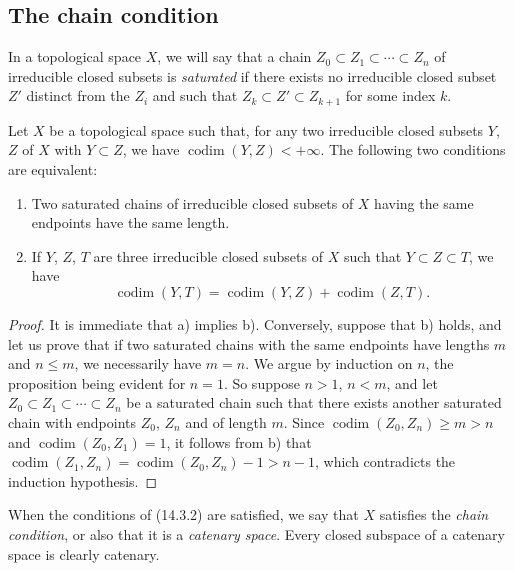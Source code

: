\subsection{The chain condition}
\label{subsection:0.14.3}

\begin{env}[14.3.1]
\label{0.14.3.1}
In a topological space $X$, we will say that a chain
$Z_0\subset Z_1\subset\cdots\subset Z_n$ of irreducible closed subsets is
\emph{saturated} if there exists no irreducible closed subset $Z'$ distinct
from the $Z_i$ and such that $Z_k\subset Z'\subset Z_{k+1}$ for some index $k$.
\end{env}

\begin{proposition}[14.3.2]
\label{0.14.3.2}
Let $X$ be a topological space such that, for any two irreducible closed
subsets $Y$, $Z$ of $X$ with $Y\subset Z$, we have
$\operatorname{codim}(Y,Z)<+\infty$. The following two conditions are
equivalent:
\begin{enumerate}
  \item[\rm(a)] Two saturated chains of irreducible closed subsets of $X$
  having the same endpoints have the same length.
  \item[\rm(b)] If $Y$, $Z$, $T$ are three irreducible closed subsets of
  $X$ such that $Y\subset Z\subset T$, we have
  \[
    \operatorname{codim}(Y,T)=
    \operatorname{codim}(Y,Z)+\operatorname{codim}(Z,T).
    \tag{14.3.2.1}\label{0.14.3.2.1}
  \]
\end{enumerate}
\end{proposition}

\begin{proof}
It is immediate that a) implies b). Conversely, suppose that b) holds, and
let us prove that if two saturated chains with the same endpoints have lengths
$m$ and $n\leq m$, we necessarily have $m=n$. We argue by induction on
$n$, the proposition being evident for $n=1$. So suppose $n>1$, $n<m$,
and let $Z_0\subset Z_1\subset\cdots\subset Z_n$ be a
saturated chain such that there exists another saturated chain with endpoints
$Z_0$, $Z_n$ and of length $m$. Since
$\operatorname{codim}(Z_0,Z_n)\geq m>n$ and
$\operatorname{codim}(Z_0,Z_1)=1$, it follows from b) that
$\operatorname{codim}(Z_1,Z_n)=\operatorname{codim}(Z_0,Z_n)-1>n-1$, which
contradicts the induction hypothesis.
\end{proof}

When the conditions of (14.3.2) are satisfied, we say that $X$ satisfies
the \emph{chain condition}, or also that it is a \emph{catenary space}.
Every closed subspace of a catenary space is clearly catenary.

